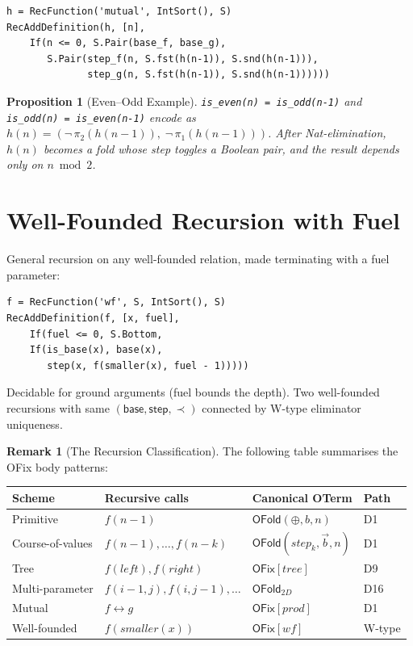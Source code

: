 \documentclass[11pt,a4paper]{report}
\theoremstyle{definition}
\newtheorem{remark}[definition]{Remark}
\theoremstyle{plain}
\newtheorem{proposition}[definition]{Proposition}
\begin{document}
\begin{lstlisting}[caption={Mutual recursion as product}]
h = RecFunction('mutual', IntSort(), S)
RecAddDefinition(h, [n],
    If(n <= 0, S.Pair(base_f, base_g),
       S.Pair(step_f(n, S.fst(h(n-1)), S.snd(h(n-1))),
              step_g(n, S.fst(h(n-1)), S.snd(h(n-1))))))
\end{lstlisting}

\begin{proposition}[Even--Odd Example]
\texttt{is\_even(n) = is\_odd(n-1)} and \texttt{is\_odd(n) = is\_even(n-1)}
encode as $h(n) = (\lnot\, \pi_2(h(n{-}1)),\; \lnot\, \pi_1(h(n{-}1)))$.
After Nat-elimination, $h(n)$ becomes a fold whose step toggles a
Boolean pair, and the result depends only on $n \bmod 2$.
\end{proposition}

\section{Well-Founded Recursion with Fuel}

General recursion on any well-founded relation, made terminating
with a fuel parameter:

\begin{lstlisting}[caption={Well-founded recursion}]
f = RecFunction('wf', S, IntSort(), S)
RecAddDefinition(f, [x, fuel],
    If(fuel <= 0, S.Bottom,
    If(is_base(x), base(x),
       step(x, f(smaller(x), fuel - 1)))))
\end{lstlisting}

Decidable for ground arguments (fuel bounds the depth).  Two
well-founded recursions with same $(\mathsf{base}, \mathsf{step},
\prec)$ connected by W-type eliminator uniqueness.

\begin{remark}[The Recursion Classification]
The following table summarises the OFix body patterns:
\begin{center}
\begin{tabular}{llll}
\toprule
\textbf{Scheme} & \textbf{Recursive calls} & \textbf{Canonical OTerm} & \textbf{Path} \\
\midrule
Primitive        & $f(n{-}1)$               & $\mathsf{OFold}(\oplus, b, n)$    & D1 \\
Course-of-values & $f(n{-}1), \ldots, f(n{-}k)$ & $\mathsf{OFold}(\mathit{step}_k, \vec{b}, n)$ & D1 \\
Tree             & $f(\mathit{left}), f(\mathit{right})$ & $\mathsf{OFix}[\mathit{tree}]$ & D9 \\
Multi-parameter  & $f(i{-}1,j), f(i,j{-}1), \ldots$ & $\mathsf{OFold}_{2D}$ & D16 \\
Mutual           & $f \leftrightarrow g$    & $\mathsf{OFix}[\mathit{prod}]$    & D1 \\
Well-founded     & $f(\mathit{smaller}(x))$ & $\mathsf{OFix}[\mathit{wf}]$      & W-type \\
\bottomrule
\end{tabular}
\end{center}
\end{remark}
\end{document}
